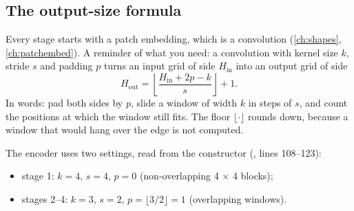 \subsection{The output-size formula}

Every stage starts with a patch embedding, which is a convolution (\cref{ch:shapes}, \cref{ch:patchembed}).
A reminder of what you need: a convolution with kernel size $k$, stride
$s$ and padding $p$ turns an input grid of side $H_{\text{in}}$ into an output grid of side
\begin{equation}\label{eq:encoder:convout}
H_{\text{out}} = \left\lfloor \frac{H_{\text{in}} + 2p - k}{s} \right\rfloor + 1 .
\end{equation}
In words: pad both sides by $p$, slide a window of width $k$ in steps of $s$, and count the positions
at which the window still fits. The floor $\lfloor\cdot\rfloor$ rounds down, because a window that would
hang over the edge is not computed.

The encoder uses two settings, read from the constructor (, lines 108--123):
\begin{itemize}
\item stage 1: $k = 4$, $s = 4$, $p = 0$ (non-overlapping 4 $\times$ 4 blocks);
\item stages 2--4: $k = 3$, $s = 2$, $p = \lfloor 3/2 \rfloor = 1$ (overlapping windows).
\end{itemize}


